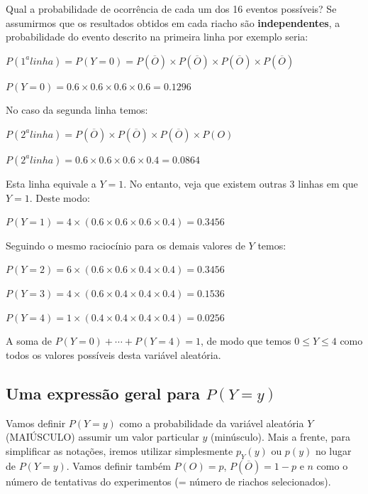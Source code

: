 \documentclass[
]{book}
\begin{document}
Qual a probabilidade de ocorrência de cada um dos 16 eventos possíveis? Se assumirmos que os resultados obtidos em cada riacho são \textbf{independentes}, a probabilidade do evento descrito na primeira linha por exemplo seria:

\(P(1^a linha) = P(Y = 0) = P(\overline{O}) \times P(\overline{O}) \times P(\overline{O}) \times P(\overline{O})\)

\(P(Y = 0) = 0.6 \times 0.6 \times 0.6 \times 0.6 = 0.1296\)

No caso da segunda linha temos:

\(P(2^a linha) = P(\overline{O}) \times P(\overline{O}) \times P(\overline{O}) \times P(O)\)

\(P(2^a linha) = 0.6 \times 0.6 \times 0.6 \times 0.4 = 0.0864\)

Esta linha equivale a \(Y = 1\). No entanto, veja que existem outras 3 linhas em que \(Y = 1\). Deste modo:

\(P(Y = 1) = 4 \times (0.6 \times 0.6 \times 0.6 \times 0.4) = 0.3456\)

Seguindo o mesmo raciocínio para os demais valores de \(Y\) temos:

\(P(Y = 2) = 6 \times (0.6 \times 0.6 \times 0.4 \times 0.4) = 0.3456\)

\(P(Y = 3) = 4 \times (0.6 \times 0.4 \times 0.4 \times 0.4) = 0.1536\)

\(P(Y = 4) = 1 \times (0.4 \times 0.4 \times 0.4 \times 0.4) = 0.0256\)

A soma de \(P(Y = 0) + \cdots + P(Y = 4) = 1\), de modo que temos \(0 \le Y \le 4\) como todos os valores possíveis desta variável aleatória.

\hypertarget{uma-expressuxe3o-geral-para-py-y}{%
\subsection*{\texorpdfstring{Uma expressão geral para \(P(Y = y)\)}{Uma expressão geral para P(Y = y)}}\label{uma-expressuxe3o-geral-para-py-y}}

Vamos definir \(P(Y = y)\) como a probabilidade da variável aleatória \(Y\) (MAIÚSCULO) assumir um valor particular \(y\) (minúsculo). Mais a frente, para simplificar as notações, iremos utilizar simplesmente \(p_{Y}(y)\) ou \(p(y)\) no lugar de \(P(Y = y)\). Vamos definir também \(P(O) = p\), \(P(\overline{O}) = 1 - p\) e \(n\) como o número de tentativas do experimentos (= número de riachos selecionados).
\end{document}
